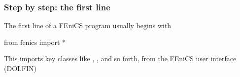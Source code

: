 \begin{frame}[fragile]
  \frametitle{Step by step: the first line}

  The first line of a FEniCS program usually begins with

  \begin{python}
from fenics import *
  \end{python}

  \bigskip

  This imports key classes like , ,
   and so forth, from the FEniCS user interface
  (DOLFIN)

\end{frame}
